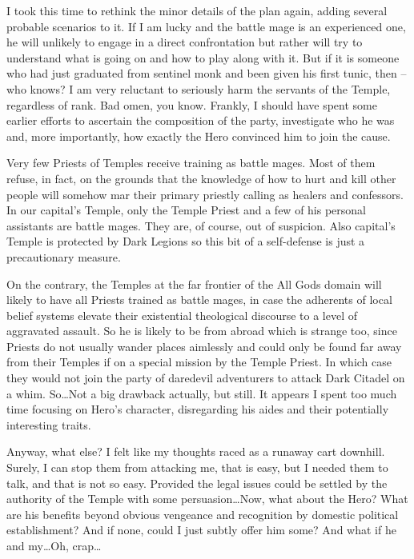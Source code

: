I took this time to rethink the minor details of the plan again, adding several probable scenarios to it. If I am lucky and the battle mage is an experienced one, he will unlikely to engage in a direct confrontation but rather will try to understand what is going on and how to play along with it. But if it is someone who had just graduated from sentinel monk and been given his first tunic, then -- who knows? I am very reluctant to seriously harm the servants of the Temple, regardless of rank. Bad omen, you know. Frankly, I should have spent some earlier efforts to ascertain the composition of the party, investigate who he was and, more importantly, how exactly the Hero convinced him to join the cause.

Very few Priests of Temples receive training as battle mages. Most of them refuse, in fact, on the grounds that the knowledge of how to hurt and kill other people will somehow mar their primary priestly calling as healers and confessors. In our capital's Temple, only the Temple Priest and a few of his personal assistants are battle mages. They are, of course, out of suspicion. Also capital's Temple is protected by Dark Legions so this bit of a self-defense is just a precautionary measure.

On the contrary, the Temples at the far frontier of the All Gods domain will likely to have all Priests trained as battle mages, in case the adherents of local belief systems elevate their existential theological discourse to a level of aggravated assault. So he is likely to be from abroad which is strange too, since Priests do not usually wander places aimlessly and could only be found far away from their Temples if on a special mission by the Temple Priest. In which case they would not join the party of daredevil adventurers to attack Dark Citadel on a whim. So\dots Not a big drawback actually, but still. It appears I spent too much time focusing on Hero's character, disregarding his aides and their potentially interesting traits.

Anyway, what else? I felt like my thoughts raced as a runaway cart downhill. Surely, I can stop them from attacking me, that is easy, but I needed them to talk, and that is not so easy. Provided the legal issues could be settled by the authority of the Temple with some persuasion\dots Now, what about the Hero? What are his benefits beyond obvious vengeance and recognition by domestic political establishment? And if none, could I just subtly offer him some? And what if he and my\dots Oh, crap\dots

